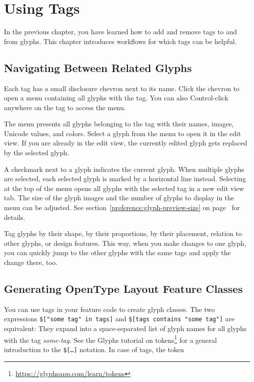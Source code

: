 \chapter{Using Tags}%
\label{cha:using_tags}

In the previous chapter, you have learned how to add and remove tags to and from glyphs.
This chapter introduces workflows for which tags can be helpful.

\section{Navigating Between Related Glyphs}%
\label{sec:navigating-between-related-glyphs}

Each tag has a small disclosure chevron next to its name.
Click the chevron to open a menu containing all glyphs with the tag.
You can also Control-click anywhere on the tag to access the menu.

\medbreak\noindent{}

\medbreak\noindent The menu presents all glyphs belonging to the tag with their names, images, Unicode values, and colors.
Select a glyph from the menu to open it in the edit view.
If you are already in the edit view, the currently edited glyph gets replaced by the selected glyph.

A checkmark next to a glyph indicates the current glyph.
When multiple glyphs are selected, each selected glyph is marked by a horizontal line instead.
Selecting  at the top of the menu opens all glyphs with the selected tag in a new edit view tab.
The size of the glyph images and the number of glyphs to display in the menu can be adjusted.
See section~\ref{preference:glyph-preview-size} on page~\pageref{preference:glyph-preview-size} for details.

Tag glyphs by their shape, by their proportions, by their placement, relation to other glyphs, or design features.
This way, when you make changes to one glyph, you can quickly jump to the other glyphs with the same tags and apply the change there, too.

\section{Generating OpenType Layout Feature Classes}%
\label{sec:generating-opentype-layout-feature-classes}

You can use tags in your feature code to create glyph classes.
The two expressions \texttt{\$["some tag" in tags]} and \texttt{\$[tags contains "some tag"]} are equivalent:
They expand into a space-separated list of glyph names for all glyphs with the tag \emph{some-tag}.
See the Glyphs tutorial on tokens\footnote{\url{https://glyphsapp.com/learn/tokens}} for a general introduction to the \texttt{\$[…]} notation.
In case of tags, the token

